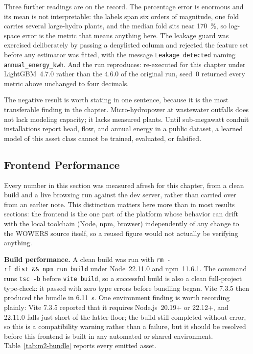 \documentclass[12pt,letterpaper]{report}
\begin{document}
Three further readings are on the record. The percentage error is enormous and its
mean is not interpretable: the labels span six orders of magnitude, one fold
carries several large-hydro plants, and the median fold sits near 170~\%, so
log-space error is the metric that means anything here. The leakage guard was
exercised deliberately by passing a denylisted column and rejected the feature set
before any estimator was fitted, with the message \texttt{Leakage detected}
naming \texttt{annual\_energy\_kwh}. And the run reproduces: re-executed for this
chapter under LightGBM~4.7.0 rather than the 4.6.0 of the original run, seed~0
returned every metric above unchanged to four decimals.

The negative result is worth stating in one sentence, because it is the most
transferable finding in the chapter. Micro-hydropower at wastewater outfalls does
not lack modeling capacity; it lacks measured plants. Until sub-megawatt conduit
installations report head, flow, and annual energy in a public dataset, a learned
model of this asset class cannot be trained, evaluated, or falsified.

\subsection{Frontend Performance}                        %

Every number in this section was measured afresh for this chapter, from a
clean build and a live browsing run against the dev server, rather than
carried over from an earlier note. This distinction matters here more than
in most results sections: the frontend is the one part of the platform
whose behavior can drift with the local toolchain (Node, npm, browser)
independently of any change to the WOWERS source itself, so a reused
figure would not actually be verifying anything.

\textbf{Build performance.} A clean build was run with
\texttt{rm~-rf~dist~\&\&~}\allowbreak\texttt{npm~run~build} under Node~22.11.0 and npm~11.6.1.
The command runs \texttt{tsc~-b} before \texttt{vite~build}, so a
successful build is also a clean full-project type-check: it passed with
zero type errors before bundling began. Vite 7.3.5 then produced the
bundle in 6.11~s. One environment finding is worth recording plainly: Vite
7.3.5 reported that it requires Node.js~20.19+ or 22.12+, and 22.11.0
falls just short of the latter floor; the build still completed without
error, so this is a compatibility warning rather than a failure, but it
should be resolved before this frontend is built in any automated or
shared environment. Table~\ref{tab:m2-bundle} reports every emitted
asset.
\end{document}
